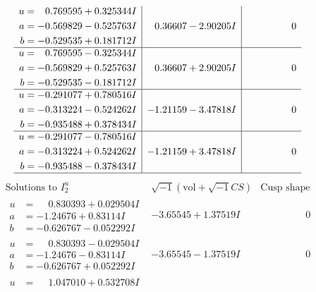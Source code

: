 \documentclass[1p]{elsarticle_modified}
\theoremstyle{definition}
\newcommand{\I}{\sqrt{-1}}
\begin{document}
$$\begin{array}{c|c|c}
\begin{aligned}
u &= \phantom{-}0.769595 + 0.325344 I \\
a &= -0.569829 - 0.525763 I \\
b &= -0.529535 + 0.181712 I\end{aligned}
 & \phantom{-}0.36607 - 2.90205 I & \phantom{-0.000000 } 0 \\ \hline\begin{aligned}
u &= \phantom{-}0.769595 - 0.325344 I \\
a &= -0.569829 + 0.525763 I \\
b &= -0.529535 - 0.181712 I\end{aligned}
 & \phantom{-}0.36607 + 2.90205 I & \phantom{-0.000000 } 0 \\ \hline\begin{aligned}
u &= -0.291077 + 0.780516 I \\
a &= -0.313224 - 0.524262 I \\
b &= -0.935488 + 0.378434 I\end{aligned}
 & -1.21159 - 3.47818 I & \phantom{-0.000000 } 0 \\ \hline\begin{aligned}
u &= -0.291077 - 0.780516 I \\
a &= -0.313224 + 0.524262 I \\
b &= -0.935488 - 0.378434 I\end{aligned}
 & -1.21159 + 3.47818 I & \phantom{-0.000000 } 0\\
 \hline 
 \end{array}$$\newpage$$\begin{array}{c|c|c}  
\text{Solutions to }I^u_{2}& \I (\text{vol} + \sqrt{-1}CS) & \text{Cusp shape}\\
 \hline 
\begin{aligned}
u &= \phantom{-}0.830393 + 0.029504 I \\
a &= -1.24676 + 0.83114 I \\
b &= -0.626767 - 0.052292 I\end{aligned}
 & -3.65545 + 1.37519 I & \phantom{-0.000000 } 0 \\ \hline\begin{aligned}
u &= \phantom{-}0.830393 - 0.029504 I \\
a &= -1.24676 - 0.83114 I \\
b &= -0.626767 + 0.052292 I\end{aligned}
 & -3.65545 - 1.37519 I & \phantom{-0.000000 } 0 \\ \hline\begin{aligned}
u &= \phantom{-}1.047010 + 0.532708 I \\

\end{aligned}
\end{array}$$
\end{document}
